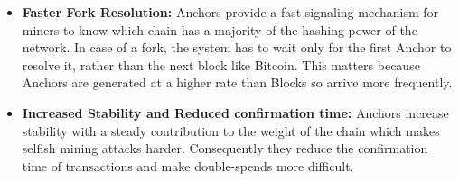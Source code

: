 \begin{itemize}
	\item \textbf{Faster Fork Resolution:} 
        Anchors provide a fast signaling mechanism for miners to know which chain has a majority of the hashing power of the network. 
        In case of a fork, the system has to wait only for the first Anchor to resolve it, rather than the next block like Bitcoin.
        This matters because Anchors are generated at a higher rate than Blocks so arrive more frequently.
	
	
    \item \textbf{Increased Stability and Reduced confirmation time:} 
        Anchors increase stability with a steady contribution to the weight of the chain which makes selfish mining attacks harder. 
        Consequently they reduce the confirmation time of transactions and make double-spends more difficult.
		
	


\end{itemize}
